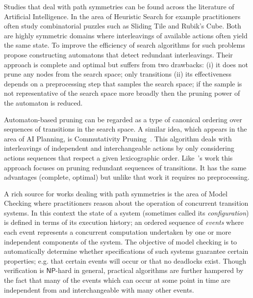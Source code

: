 Studies that deal with path symmetries can be found across the literature of
Artificial Intelligence.  In the area of Heuristic Search for example
practitioners often study combinatorial puzzles such as Sliding Tile and
Rubik's Cube. Both are highly symmetric domains where interleavings of
available actions often yield the same state. To improve the efficiency of
search algorithms for such problems ~\cite{taylor93} propose constructing
automatons that detect redundant interleavings.  Their approach is complete
and optimal but suffers from two drawbacks: (i) it does not prune any nodes
from the search space; only transitions (ii) its effectiveness depends on a
preprocessing step that samples the search space; if the sample is not
representative of the search space more broadly then the pruning power of the
automaton is reduced.

Automaton-based pruning can be regarded as a type of canonical ordering over
sequences of transitions in the search space. A similar idea, which appears in
the area of AI Planning, is Commutativity Pruning~\citep{haslum00}. This
algorithm deals with interleavings of independent and interchangeable actions
by only considering actions sequences that respect a given lexicographic
order. Like~\cite{taylor93}'s work this approach focuses on pruning redundant
sequences of transitions.  It has the same advantages (complete, optimal) but
unlike that work it requires no preprocessing.

A rich source for works dealing with path symmetries is the area
of Model Checking where practitioners reason about the operation of concurrent
transition systems.  In this context the state of a system (sometimes called
its \emph{configuration}) is defined in terms of its execution history; an
ordered sequence of \emph{events} where each event represents a concurrent
computation undertaken by one or more independent components of the system.
The objective of model checking is to automatically determine whether
specifications of such systems guarantee certain properties; e.g.  that
certain events will occur or that no deadlocks exist.  Though verification is
$\mathsf{NP}$-hard in general, practical algorithms are further hampered by
the fact that many of the events which can occur at some point in time are
independent from and interchangeable with many other events. 

